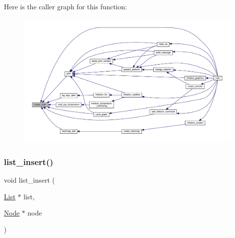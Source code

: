 Here is the caller graph for this function\+:
\nopagebreak
\begin{figure}[H]
\begin{center}
\leavevmode
\includegraphics[width=350pt]{linked-list_8c_a45dfa9366701eddf667fd95d05cc3be0_icgraph}
\end{center}
\end{figure}
\mbox{\label{linked-list_8c_a947069a28d8173531d9186a74e82fb62}} 
\subsubsection{\texorpdfstring{list\+\_\+insert()}{list\_insert()}}
{\footnotesize\ttfamily void list\+\_\+insert (\begin{DoxyParamCaption}\item[{\hyperlink{structList}{List} $\ast$}]{list,  }\item[{\hyperlink{structNode}{Node} $\ast$}]{node }\end{DoxyParamCaption})}

